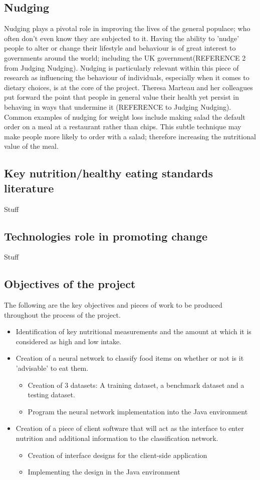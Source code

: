\documentclass[11pt]{article}
\begin{document}
	\subsection{Nudging}
	Nudging plays a pivotal role in improving the lives of the general populace; who often don't even know they are subjected to it. Having the ability to 'nudge' people to 	alter or change their lifestyle and behaviour is of great interest to governments 			around the world; including the UK government(REFERENCE 2 from Judging Nudging). 			Nudging is particularly relevant within this piece of research as influencing the 			behaviour of individuals, especially when it comes to dietary choices, is at the core 		of the project. Theresa Marteau and her colleagues put forward the point that people in general value their health yet persist in behaving in ways that undermine it (REFERENCE to Judging Nudging). Common examples of nudging for weight loss include making salad the default order on a meal at a restaurant rather than chips. This subtle technique may make people more likely to order with a salad; therefore increasing the nutritional value of the meal.
	\subsection{Key nutrition/healthy eating standards literature}
	Stuff
	\subsection{Technologies role in promoting change}
	Stuff
	\subsection{Objectives of the project}
	The following are the key objectives and pieces of work to be produced throughout the process of the project.
	\begin{itemize}
		\item Identification of key nutritional measurements and the amount at which it is considered as high and low intake.
		\item Creation of a neural network to classify food items on whether or not is it 'advisable' to eat them.
		\begin{itemize}
			\item Creation of 3 datasets: A training dataset, a benchmark dataset and a testing dataset.
			\item Program the neural network implementation into the Java environment 
		\end{itemize}
		\item Creation of a piece of client software that will act as the interface to enter nutrition and additional information to the classification network.
		\begin{itemize}
			\item Creation of interface designs for the client-side application
			\item Implementing the design in the Java environment
		\end{itemize}
	\end{itemize}
\pagebreak
\end{document}
